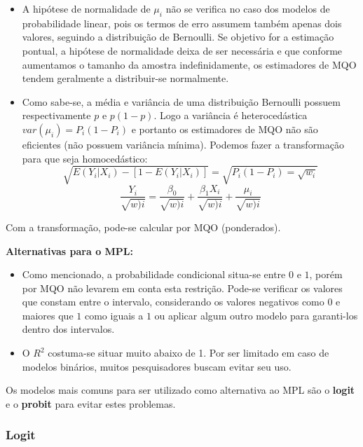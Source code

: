 \documentclass[
]{book}
\begin{document}
\begin{itemize}
\item
  A hipótese de normalidade de \(\mu_i\) não se verifica no caso dos modelos de probabilidade linear, pois os termos de erro assumem também apenas dois valores, seguindo a distribuição de Bernoulli. Se objetivo for a estimação pontual, a hipótese de normalidade deixa de ser necessária \citep{gujarati2011econometria} e que conforme aumentamos o tamanho da amostra indefinidamente, os estimadores de MQO tendem geralmente a distribuir-se normalmente.
\item
  Como sabe-se, a média e variância de uma distribuição Bernoulli possuem respectivamente \(p\) e \(p(1-p)\). Logo a variância é heterocedástica \(var(\mu_i)=P_i(1-P_i)\) e portanto os estimadores de MQO não são eficientes (não possuem variância mínima). Podemos fazer a transformação para que seja homocedástico:
  \[\sqrt{E(Y_i|X_i)-[1-E(Y_i|X_i)]}=\sqrt{P_i(1-P_i)=\sqrt{w_i}}\]
  \begin{equation}
    \frac{Y_i}{\sqrt{w)i}} = \frac{\beta_0}{\sqrt{w)i}}+\frac{\beta_1 X_i}{\sqrt{w)i}}+\frac{\mu_i}{\sqrt{w)i}}
    \label{eq:probhomecedastico}
  \end{equation}
\end{itemize}

Com a transformação, pode-se calcular por MQO (ponderados).

\textbf{Alternativas para o MPL:}

\begin{itemize}
\item
  Como mencionado, a probabilidade condicional situa-se entre \(0\) e \(1\), porém por MQO não levarem em conta esta restrição. Pode-se verificar os valores que constam entre o intervalo, considerando os valores negativos como \(0\) e maiores que \(1\) como iguais a \(1\) ou aplicar algum outro modelo para garanti-los dentro dos intervalos.
\item
  O \(R^2\) costuma-se situar muito abaixo de 1. Por ser limitado em caso de modelos binários, muitos pesquisadores buscam evitar seu uso.
\end{itemize}

Os modelos mais comuns para ser utilizado como alternativa ao MPL são o \textbf{logit} e o \textbf{probit} para evitar estes problemas.

\hypertarget{logit}{%
\subsubsection{Logit}\label{logit}}
\end{document}
